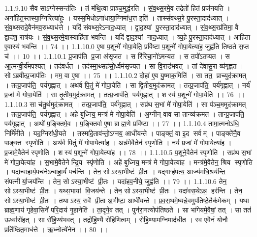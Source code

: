 1.1.9.10
सैव साऽग्नेस्सन्त॑तिः । तं म॑थि॒त्वा प्राञ्च॒मुद्ध॑रति । सं॒व॒थ्स॒रमे॒व तद्रेतो॑ हि॒तं प्रज॑नयति । अना॑हित॒स्तस्या॒ग्निरित्या॑हुः । यस्स॒मिधोऽना॑धाया॒ग्निमा॑ध॒त्त इति॑ । तास्सं॑वथ्स॒रे पु॒रस्ता॒दाद॑ध्यात् । सं॒व॒थ्सरादे॒वैन॑मव॒रुध्याध॑त्ते । यदि॑ संवथ्स॒रेऽनाद॒ध्यात् । द्वा॒द॒श्यां पु॒रस्ता॒दाद॑ध्यात् । सं॒व॒थ्स॒रप्र॑तिमा॒ वै द्वाद॑श॒ रात्र॑यः । सं॒व॒थ्स॒रमे॒वास्याहि॑ता भवन्ति । यदि॑ द्वाद॒श्यां नाद॒ध्यात् । त्र्य॒हे पु॒रस्ता॒दाद॑ध्यात् । आहि॑ता ए॒वास्य॑ भवन्ति ।। 74 ।।
1.1.10.0
ए॒षा प॒शून्मे॑ गोपा॒येति॒ प्रवि॑ष्टा प॒शून्मे॑ गोपा॒येत्या॑ह॒ जुह्व॑ति तिष्ठते स॒प्त च॑ ।। 10 ।।
1.1.10.1
प्र॒जाप॑ति प्र॒जा अ॑सृजत । स रि॑रिचा॒नो॑ऽमन्यत । स तपो॑ऽतप्यत । स आ॒त्मन्वी॒र्य॑मपश्यत् । तद॑वर्धत । तद॑स्मा॒थ्सह॑सो॒र्ध्वम॑सृज्यत । सा वि॒राड॑भवत् । तां दे॑वासु॒रा व्य॑गृह्णत । सोऽब्रवीत्प्र॒जाप॑तिः । मम॒ वा ए॒षा ।। 75 ।।
1.1.10.2
दोहा॑ ए॒व यु॒ष्माक॒मिति॑ । सा तत॒ प्राच्युद॑क्रामत् । तत्प्र॒जाप॑ति॒ पर्य॑गृह्णात् । अथ॑र्व पि॒तुं मे॑ गोपा॒येति॑ । सा द्वि॒तीय॒मुद॑क्रामत् । तत्प्र॒जाप॑ति॒ पर्य॑गृह्णात् । नर्य॑ प्र॒जां मे॑ गोपा॒येति॑ । सा तृ॒तीय॒मुद॑क्रामत् । तत्प्र॒जाप॑ति॒ पर्य॑गृह्णात् । शस्य॑ प॒शून्मे॑ गोपा॒येति॑ ।। 76 ।।
1.1.10.3
सा च॑तु॒र्थमुद॑क्रामत् । तत्प्र॒जाप॑ति॒ पर्य॑गृह्णात् । सप्र॑थ स॒भां मे॑ गोपा॒येति॑ । सा प॑ञ्च॒ममुद॑क्रामत् । तत्प्र॒जाप॑ति॒ पर्य॑गृह्णात् । अहे॑ बुध्निय॒ मन्त्रं॑ मे गोपा॒येति॑ । अ॒ग्नीन् वाव सा तान्व्य॑क्रमत । तान्प्र॒जाप॑ति॒ पर्य॑गृह्णात् । अथो॑ प॒ङ्क्तिमे॒व । प॒ङ्क्तिर्वा ए॒षा ब्राह्म॒णे प्रवि॑ष्टा ।। 77 ।।
1.1.10.4
तामा॒त्मनोऽधि॒ निर्मि॑मीते । यद॒ग्निरा॑धी॒यते । तस्मा॑दे॒ताव॑न्तो॒ऽग्नय॒ आधी॑यन्ते । पाङ्क्तं॒ वा इ॒द सर्वम् । पाङ्क्ते॑नै॒व पाङ्क्त॑ स्पृणोति । अथ॑र्व पि॒तुं मे॑ गोपा॒येत्या॑ह । अन्न॑मे॒वैतेन॑ स्पृणोति । नर्य॑ प्र॒जां मे॑ गोपा॒येत्या॑ह । प्र॒जामे॒वैतेन॑ स्पृणोति । शस्य॑ प॒शून्मे॑ गोपा॒येत्या॑ह ।। 78 ।।
1.1.10.5
प॒शूने॒वैतेन॑ स्पृणोति । सप्र॑थ स॒भां मे॑ गोपा॒येत्या॑ह । स॒भामे॒वैतेनेन्द्रि॒य स्पृ॑णोति । अहे॑ बुध्निय॒ मन्त्रं॑ मे गोपा॒येत्या॑ह । मन्त्र॑मे॒वैतेन॒ श्रिय॑ स्पृणोति । यदा॑न्वाहार्य॒पच॑नेऽन्वाहा॒र्यं॑ पच॑न्ति । तेन॒ सोऽस्या॒भीष्ट॑ प्री॒तः । यद्गाऱ्ह॑पत्य॒ आज्य॑मधि॒श्रय॑न्ति॒ संपत्नीर्या॒जय॑न्ति । तेन॒ सोऽस्या॒भीष्ट॑ प्री॒तः । यदा॑हव॒नीये॒ जुह्व॑ति ।। 79 ।।
1.1.10.6
तेन॒ सोऽस्या॒भीष्ट॑ प्री॒तः । यथ्स॒भायां वि॒जय॑न्ते । तेन॒ सोऽस्या॒भीष्ट॑ प्री॒तः । यदा॑वस॒थेऽन्न॒॒ हर॑न्ति । तेन॒ सोऽस्या॒भीष्ट॑ प्री॒तः । तथाऽस्य॒ सर्वे प्री॒ता अ॒भीष्टा॒ आधी॑यन्ते । प्र॒व॒स॒थमे॒ष्यन्ने॒वमुप॑तिष्ठे॒तैक॑मेकम् । यथा ब्राह्म॒णाय॑ गृहेवा॒सिने॑ परि॒दाय॑ गृ॒हानेति॑ । ता॒दृगे॒व तत् । पुन॑रा॒गत्योप॑तिष्ठते । सा भा॑गेयमे॒वैषां॒ तत् । सा तत॑ ऊ॒र्ध्वारो॑हत् । सा रो॑हि॒ण्य॑भवत् । तद्रो॑हि॒ण्यै रो॑हिणि॒त्वम् । रो॒हि॒ण्याम॒ग्निमाद॑धीत । स्व ए॒वैनं॒ योनौ॒ प्रति॑ष्ठित॒माध॑त्ते । ऋ॒ध्नोत्ये॑नेन ।। 80 ।।
